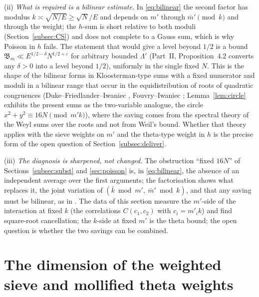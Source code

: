 \documentclass[11pt]{amsart}
\theoremstyle{remark}
\newcommand{\e}{\varepsilon}
\begin{document}
(ii) \emph{What is required is a bilinear estimate.} In \eqref{eq:bilinear} the second factor has modulus $k\asymp\sqrt{N/E}\ge\sqrt N/E$ and depends on $m'$ through $\bar m'\pmod k$ and through the weight; the $h$-sum is short relative to both moduli (Section~\ref{subsec:CS}) and does not complete to a Gauss sum, which is why Poisson in $h$ fails. The statement that would give a level beyond $1/2$ is a bound $\mathfrak B_m\ll E^{1/2-\delta}N^{1/2+\e}$ for arbitrary bounded $\Lambda'$ (Part~II, Proposition~4.2 converts any $\delta>0$ into a level beyond $1/2$), uniformly in the single fixed $N$. This is the shape of the bilinear forms in Kloosterman-type sums with a fixed numerator and moduli in a bilinear range that occur in the equidistribution of roots of quadratic congruences (Duke--Friedlander--Iwaniec \cite{DFI}, Fouvry--Iwaniec \cite{FI}; Lemma~\ref{lem:circle} exhibits the present sums as the two-variable analogue, the circle $x^2+y^2\equiv16N\pmod{m'k}$), where the saving comes from the spectral theory of the Weyl sums over the roots and not from Weil's bound. Whether that theory applies with the sieve weights on $m'$ and the theta-type weight in $h$ is the precise form of the open question of Section~\ref{subsec:deliver}.

(iii) \emph{The diagnosis is sharpened, not changed.} The obstruction ``fixed $16N$'' of Sections~\ref{subsec:subst} and \ref{sec:poisson} is, in \eqref{eq:bilinear}, the absence of an independent average over the first arguments; the factorisation shows what replaces it, the joint variation of $(\bar k\bmod m',\ \bar m'\bmod k)$, and that any saving must be bilinear, as in \cite{BFI,DFI}. The data of this section measure the $m'$-side of the interaction at fixed $k$ (the correlations $C(c_1,c_2)$ with $c_i=m'_ik$) and find square-root cancellation; the $k$-side at fixed $m'$ is the theta bound; the open question is whether the two savings can be combined.

\section{The dimension of the weighted sieve and mollified theta weights}\label{sec:dimension}
\end{document}
